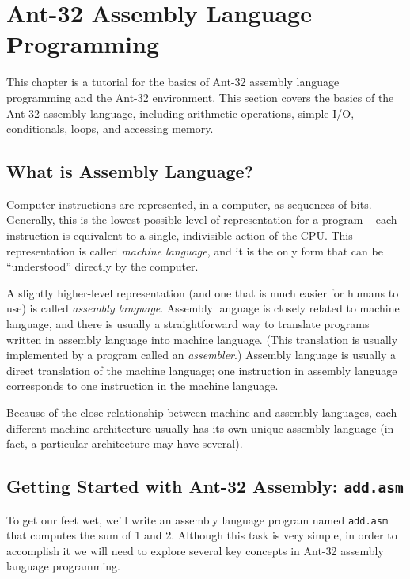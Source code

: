 %
%
%

\chapter{Ant-32 Assembly Language Programming }
\label{ant-asm-tut-intro}

This chapter is a tutorial for the basics of Ant-32 assembly
language programming and the Ant-32 environment.  This section
covers the basics of the Ant-32 assembly language, including
arithmetic operations, simple I/O, conditionals, loops, and accessing
memory.

\section{What is Assembly Language?}

Computer instructions are represented, in a computer, as sequences of
bits.  Generally, this is the lowest possible level of representation
for a program -- each instruction is equivalent to a single,
indivisible action of the CPU.  This representation is called {\em
machine language}, and it is the only form that can be ``understood''
directly by the computer.

A slightly higher-level representation (and one that
is much easier for humans to use) is called {\em assembly language}.
Assembly language is closely related to machine language,   
and there is usually a straightforward way to translate
programs written in assembly language into machine language.
(This translation is usually implemented by a program called
an {\em assembler}.)
Assembly language is usually a direct translation of the
machine language; one instruction in assembly language
corresponds to one instruction in the machine language.

Because of the close relationship between machine and assembly
languages, each different machine architecture usually has its own
unique assembly language (in fact, a particular architecture may have
several).

\section{Getting Started with Ant-32 Assembly: {\tt add.asm}}

To get our feet wet, we'll write an assembly language program named
{\tt add.asm} that computes the sum of 1 and 2.  Although this task is
very simple, in order to accomplish it we will need to explore several
key concepts in Ant-32 assembly language programming.


